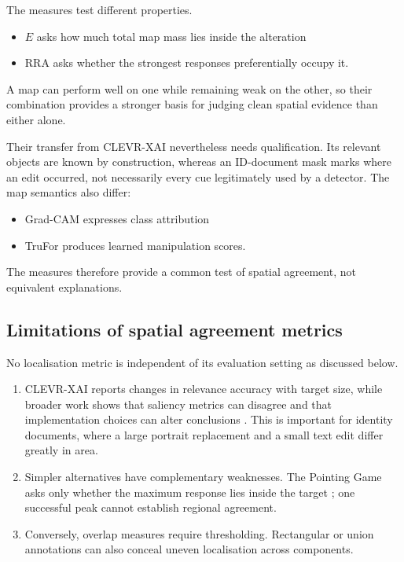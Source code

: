 The measures test different properties. 
\begin{itemize}
    \item $E$ asks how much total map mass lies inside the alteration
    \item RRA asks whether the strongest responses preferentially occupy it.
\end{itemize}
A map can perform well on one while remaining weak on the other, so their combination provides a stronger basis for judging clean spatial evidence than either alone.

Their transfer from CLEVR-XAI nevertheless needs qualification. Its relevant objects are known by construction, whereas an ID-document mask marks where an edit occurred, not necessarily every cue legitimately used by a detector. 
The map semantics also differ: 
\begin{itemize}
    \item Grad-CAM expresses class attribution
    \item TruFor produces learned manipulation scores.
\end{itemize}
The measures therefore provide a common test of spatial agreement, not equivalent explanations.

\subsection{Limitations of spatial agreement metrics}

No localisation metric is independent of its evaluation setting as discussed below. 
\begin{enumerate}
    \item CLEVR-XAI reports changes in relevance accuracy with target size, while broader work shows that saliency metrics can disagree and that implementation choices can alter conclusions \citep{arras2022clevrxai,tomsett2020sanitymetrics}. This is important for identity documents, where a large portrait replacement and a small text edit differ greatly in area.
    \item Simpler alternatives have complementary weaknesses. The Pointing Game asks only whether the maximum response lies inside the target \citep{zhang2016excitation}; one successful peak cannot establish regional agreement.
    \item Conversely, overlap measures require thresholding. Rectangular or union annotations can also conceal uneven localisation across components.
\end{enumerate}

